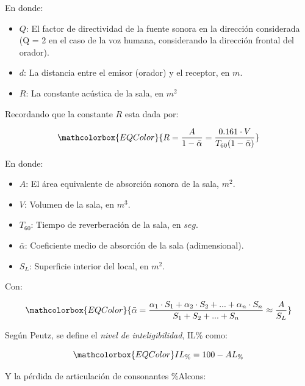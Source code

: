 \par En donde:
\begin{itemize}
    \item $Q$: El factor de directividad de la fuente sonora en la dirección considerada (Q = 2 en el caso de la voz humana, considerando la dirección frontal del orador).
    \item $d$: La distancia entre el emisor (orador) y el receptor, en $m$.
    \item $R$: La constante acústica de la sala, en $m^2$
\end{itemize}

\par Recordando que la constante $R$ esta dada por:

\begin{equation}
   \mathcolorbox{EQColor}{ R  = \frac{A}{1- \bar{\alpha}} = \frac{0.161 \cdot V}{T_{60} (1- \bar{\alpha})} }
\end{equation}

\par En donde:
\begin{itemize}
    \item $A$: El área equivalente de absorción sonora de la sala, $m^2$.
    \item $V$: Volumen de la sala, en $m^3$.
    \item $T_{60}$: Tiempo de reverberación de la sala, en $seg$.
    \item $\bar{\alpha}$: Coeficiente medio de absorción de la sala (adimensional).
    \item $S_L$: Superficie interior del local, en $m^2$.
\end{itemize}

\par Con:

\begin{equation}
   \mathcolorbox{EQColor}{ \bar{\alpha} = \frac{\alpha_1 \cdot S_1 + \alpha_2 \cdot S_2 + ... + \alpha_n \cdot S_n}{S_1 +S_2 + ...+ S_n} \approx \frac{A}{S_L} }
\end{equation}

\par Según Peutz, se define el \textit{nivel de inteligibilidad}, IL\% como:

\begin{equation}
   \mathcolorbox{EQColor}{ IL_{\%} = 100 - AL_{\%} }
\end{equation}

\par Y la pérdida de articulación de consonantes \%Alcons:

